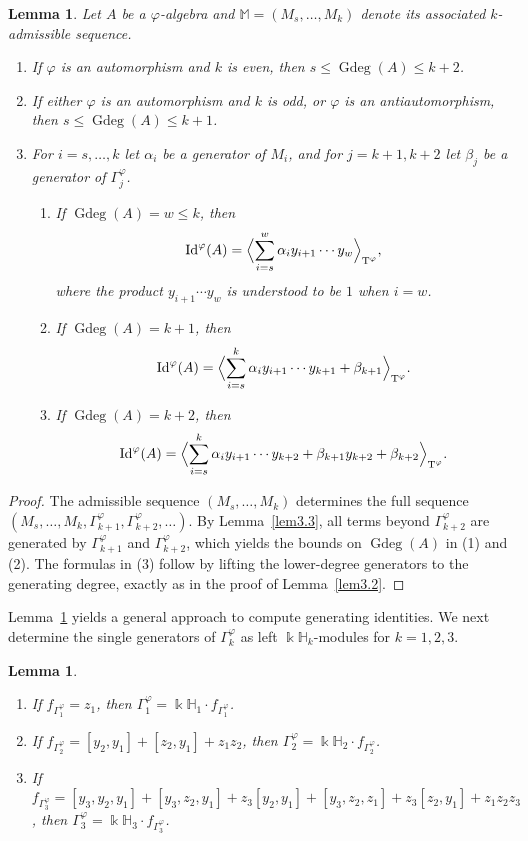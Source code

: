 \documentclass{amsart}
\newtheorem{lem}[thm]{Lemma}
\theoremstyle{definition}
\theoremstyle{remark}
\numberwithin{equation}{section}
\def \Ga{\Gamma}
\def \vp{\varphi}
\def \k{\Bbbk}
\def \H{\mathbb{H}}
\def \M{\mathbb{M}}
\def \gd{\operatorname{Gdeg}}
\def \Id{\operatorname{Id}}
\def \T{\operatorname{T}}
\begin{document}
\begin{lem} \label{lem3.4}
	Let $A$ be a $\vp$-algebra and $\M=(M_s,\dots,M_k)$ denote its associated $k$-admissible sequence.
	\begin{enumerate}
		\item[(1)]
		If $\vp$ is an automorphism and $k$ is even, then $s \leq \gd(A) \leq k+2$.
		\item[(2)]
		If either $\vp$ is an automorphism and $k$ is odd, or $\vp$ is an antiautomorphism, then $s \leq \gd(A) \leq k+1$.
		\item[(3)]
		For $i = s,\dots,k$ let $\alpha_i$ be a generator of $M_i$, and for $j = k+1,k+2$ let $\beta_j$ be a generator of $\Ga_j^\vp$.
		    \begin{enumerate}
			\item[(i)]
			If $\gd(A)=w \leq k$, then
			\[
			\Id^\vp(A) = \Bigl\langle \sum_{i=s}^{w} \alpha_i y_{i+1}\cdots y_w \Bigr\rangle_{\T^\vp},
			\]
			where the product $y_{i+1}\cdots y_w$ is understood to be $1$ when $i=w$.
			\item[(ii)]
			If $\gd(A)=k+1$, then
			\[
			\Id^\vp(A) = \Bigl\langle \sum_{i=s}^{k} \alpha_i y_{i+1}\cdots y_{k+1} + \beta_{k+1} \Bigr\rangle_{\T^\vp}.
			\]
			\item[(iii)]
			If $\gd(A)=k+2$, then
			\[
			\Id^\vp(A) = \Bigl\langle \sum_{i=s}^{k} \alpha_i y_{i+1}\cdots y_{k+2} + \beta_{k+1} y_{k+2} + \beta_{k+2} \Bigr\rangle_{\T^\vp}.
			\]	
		\end{enumerate}
	\end{enumerate}
\end{lem}	
	
\begin{proof}
	The admissible sequence $(M_s,\dots,M_k)$ determines the full sequence $(M_s,\dots, M_k, \Ga_{k+1}^\vp, \Ga_{k+2}^\vp, \dots)$. By Lemma~\ref{lem3.3}, all terms beyond $\Ga_{k+2}^\vp$ are generated by $\Ga_{k+1}^\vp$ and $\Ga_{k+2}^\vp$, which yields the bounds on $\gd(A)$ in (1) and (2). The formulas in (3) follow by lifting the lower-degree generators to the generating degree, exactly as in the proof of Lemma~\ref{lem3.2}.
\end{proof}	
	
	Lemma~\ref{lem3.4} yields a general approach to compute generating identities. We next determine the single generators of $\Ga_k^\vp$ as left $\k\H_k$-modules for $k=1,2,3$.
	
\begin{lem}	\label{lem3.5}
	\begin{enumerate}
		\item[(1)]
		If $f_{\Ga_1^\vp}=z_1$, then $\Ga_1^\vp = \k\H_1 \cdot f_{\Ga_1^\vp}$.
		\item[(2)]
		If $f_{\Ga_2^\vp}=[y_2,y_1]+[z_2,y_1]+z_1z_2$, then $\Ga_2^\vp = \k\H_2 \cdot f_{\Ga_2^\vp}$.
		\item[(3)]
		If $f_{\Ga_3^\vp}=[y_3,y_2,y_1]+[y_3,z_2,y_1]+z_3[y_2,y_1]+[y_3,z_2,z_1]+z_3[z_2,y_1]+z_1z_2z_3$, then $\Ga_3^\vp = \k\H_3 \cdot f_{\Ga_3^\vp}$.
	\end{enumerate} 
\end{lem}
\end{document}
